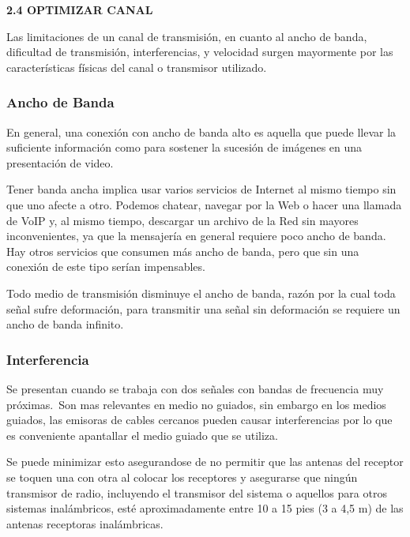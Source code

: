 \textbf{2.4 OPTIMIZAR CANAL}

Las limitaciones de un canal de transmisión, en cuanto al ancho de
banda, dificultad de transmisión, interferencias, y velocidad surgen
mayormente por las características físicas del canal o transmisor
utilizado.

\subsubsection{Ancho de Banda}

En general, una conexión con ancho de banda alto es aquella que puede
llevar la suficiente información como para sostener la sucesión de
imágenes en una presentación de video.

Tener banda ancha implica usar varios servicios de Internet al mismo
tiempo sin que uno afecte a otro. Podemos chatear, navegar por la Web o
hacer una llamada de VoIP y, al mismo tiempo, descargar un archivo de la
Red sin mayores inconvenientes, ya que la mensajería en general requiere
poco ancho de banda. Hay otros servicios que consumen más ancho de
banda, pero que sin una conexión de este tipo serían impensables.

Todo medio de transmisión disminuye el ancho de banda, razón por la cual
toda señal sufre deformación, para transmitir una señal sin deformación
se requiere un ancho de banda infinito.

\subsubsection{Interferencia}

Se presentan cuando se trabaja con dos señales con bandas de frecuencia
muy próximas.~Son mas relevantes en medio no guiados, sin embargo en los
medios guiados, las emisoras de cables cercanos pueden causar
interferencias por lo que es conveniente apantallar el medio guiado que
se utiliza.

Se puede minimizar esto asegurandose de no permitir que las antenas del
receptor se toquen una con otra al colocar los receptores y asegurarse
que ningún transmisor de radio, incluyendo el transmisor del sistema o
aquellos para otros sistemas inalámbricos, esté aproximadamente entre 10
a 15 pies (3 a 4,5 m) de las antenas receptoras inalámbricas.
